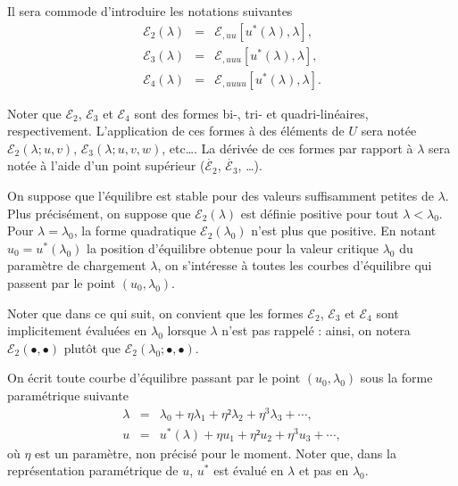 \documentclass[12pt, final]{amsart}
\begin{document}
Il sera commode d'introduire les notations suivantes
\begin{eqnarray}
  \mathcal E_2(\lambda )&=&\mathcal E_{,uu}[u^*(\lambda ), \lambda ],\\
  \mathcal E_3(\lambda )&=&\mathcal E_{,uuu}[u^*(\lambda ), \lambda ],\\
  \mathcal E_4(\lambda )&=&\mathcal E_{,uuuu}[u^*(\lambda ), \lambda ].
\end{eqnarray}

Noter que \(\mathcal E_2\), \(\mathcal E_3\) et \(\mathcal E_4\) sont des formes bi-, tri- et quadri-linéaires,
respectivement. L'application de ces formes à des éléments de \(U\) sera notée
\(\mathcal E_2(\lambda ; u, v)\), \(\mathcal E_3(\lambda ; u, v, w)\), etc\dots. La dérivée de ces formes par
rapport à \(\lambda \) sera notée à l'aide d'un point supérieur (\(\dot{\mathcal E_2}\),
\(\dot{\mathcal E_3}\), \dots).

On suppose que l'équilibre est stable pour des valeurs suffisamment petites de
\(\lambda \). Plus précisément, on suppose que \(\mathcal E_2(\lambda )\) est définie positive pour tout
\(\lambda <\lambda _0\). Pour \(\lambda =\lambda _0\), la forme quadratique \(\mathcal E_2(\lambda _0)\) n'est plus que
positive. En notant \(u_0=u^*(\lambda _0)\) la position d'équilibre obtenue pour la
valeur critique \(\lambda _0\) du paramètre de chargement \(\lambda \), on s'intéresse à
toutes les courbes d'équilibre qui passent par le point \((u_0, \lambda _0)\).

Noter que dans ce qui suit, on convient que les formes \(\mathcal E_2\), \(\mathcal E_3\) et \(\mathcal E_4\)
sont implicitement évaluées en \(\lambda _0\) lorsque \(\lambda \) n'est pas rappelé : ainsi,
on notera \(\mathcal E_2(\bullet , \bullet )\) plutôt que \(\mathcal E_2(\lambda _0; \bullet , \bullet )\).

On écrit toute courbe d'équilibre passant par le point \((u_0, \lambda _0)\) sous la
forme paramétrique suivante
\begin{eqnarray}
  \label{eq20211115075817}
  \lambda &=&\lambda _0+\eta \lambda _1+\eta ²\lambda _2+\eta ^3\lambda _3+\cdots,\\
  \label{eq20211115075835}
  u&=&u^*(\lambda )+\eta u_1+\eta ²u_2+\eta ^3u_3+\cdots,
\end{eqnarray}
où \(\eta \) est un paramètre, non précisé pour le moment. Noter que, dans la
représentation paramétrique de \(u\), \(u^*\) est évalué en \(\lambda \) et pas en
\(\lambda _0\).
\end{document}
